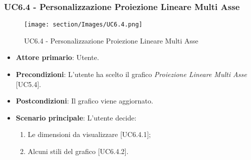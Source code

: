 \subsubsection{UC6.4 - Personalizzazione Proiezione Lineare Multi Asse}
\begin{figure}[h]
\texttt{[image: section/Images/UC6.4.png]}
\centering
\caption{UC6.4 - Personalizzazione Proiezione Lineare Multi Asse}
\end{figure}
\begin{itemize}
	\item \textbf{Attore primario}: Utente.
	
	\item \textbf{Precondizioni}: L'utente ha scelto il grafico \textit{Proiezione Lineare Multi Asse} [UC5.4].
	
	\item \textbf{Postcondizioni}: Il grafico viene aggiornato.
	
	\item \textbf{Scenario principale}: L'utente decide:
	
\begin{enumerate}
\item Le dimensioni da visualizzare [UC6.4.1];
\item Alcuni stili del grafico [UC6.4.2].
\end{enumerate}	
		
\end{itemize}